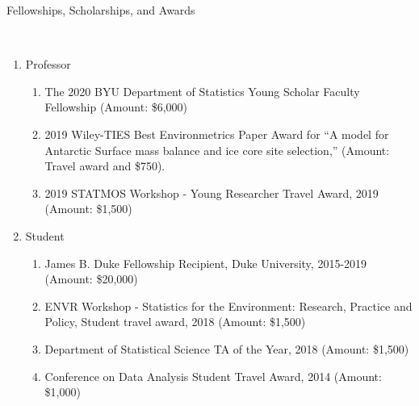\documentclass[12pt]{article}
\newcommand{\head}[1]{ %
    \bigskip %
    \begin{large}\begin{bf}{#1}\end{bf}\end{large} %

    \ \\ [-1.3cm] %

    \hrulefill}
\begin{document}
\head{Fellowships, Scholarships, and Awards}
\begin{enumerate}[label=$\bullet$]

\item Professor
\begin{enumerate}[label=$\cdot$]
\item The 2020 BYU Department of Statistics Young Scholar Faculty Fellowship (Amount: \$6,000)
\item 2019 Wiley-TIES Best Environmetrics Paper Award for ``A model for Antarctic Surface mass balance and ice core site selection,''  (Amount: Travel award and \$750).
\item 2019 STATMOS Workshop - Young Researcher Travel Award, 2019  (Amount: \$1,500)
\end{enumerate}
\item Student
\begin{enumerate}[label=$\cdot$]
\item James B. Duke Fellowship Recipient, Duke University, 2015-2019 (Amount: \$20,000)
\item ENVR Workshop - Statistics for the Environment: Research, Practice and Policy, Student travel award, 2018 (Amount: \$1,500)
\item Department of Statistical Science TA of the Year, 2018 (Amount: \$1,500)
\item Conference on Data Analysis Student Travel Award, 2014 (Amount: \$1,000)
\end{enumerate}

\end{enumerate}
\end{document}
